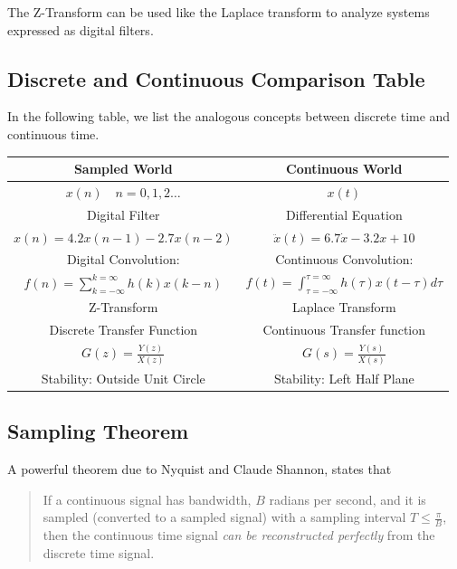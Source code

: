 The Z-Transform can be used like the Laplace transform to analyze systems expressed as digital filters.


\subsection{Discrete and Continuous Comparison Table}

In the following table, we list the analogous concepts between discrete time and continuous time. 

\renewcommand\arraystretch{1.75}%
\begin{centering}
\begin{tabular}{c|c}
{\bf Sampled World  }         &  {\bf Continuous World  }   \\ \hline
$x(n) \quad n= 0,1,2 \dots$                  &     $x(t)$           \\
Digital Filter          &  Differential Equation   \\
$x(n) = 4.2x(n-1)-2.7x(n-2)$&   $\ddot{x}(t) = 6.7\dot{x} -3.2{x} + 10 $\\
Digital Convolution:         &   Continuous Convolution:    \\
  $f(n) = \sum_{k=-\infty}^{k=\infty} h(k)x(k-n)$  &
  $f(t) = \int_{\tau=-\infty}^{\tau=\infty} h(\tau)x(t-\tau) d\tau$  \\
Z-Transform             &  Laplace Transform   \\
Discrete Transfer Function  &  Continuous Transfer function   \\
$G(z) = \frac{Y(z)}{X(z)}$   &  $G(s) = \frac{Y(s)}{X(s)}$  \\
Stability:  Outside Unit Circle  & Stability: Left Half Plane   \\
\end{tabular}
\end{centering}


\subsection{Sampling Theorem}

A powerful theorem due to Nyquist and Claude Shannon, states that

\begin{quotation}
  If a continuous signal has bandwidth, $B$ radians per second, and it is sampled (converted to a sampled signal) with
a sampling interval
$T \leq  \frac{\pi}{B}$, then the continuous time signal {\it can be reconstructed perfectly} from the discrete time signal.
\end{quotation}

